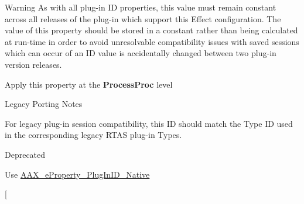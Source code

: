 \begin{Desc}
\begin{description}
\begin{DoxyWarning}{Warning}
As with all plug-\/in I\+D properties, this value must remain constant across all releases of the plug-\/in which support this Effect configuration. The value of this property should be stored in a constant rather than being calculated at run-\/time in order to avoid unresolvable compatibility issues with saved sessions which can occur of an I\+D value is accidentally changed between two plug-\/in version releases.
\end{DoxyWarning}
\begin{DoxyItemize}
\item Apply this property at the {\bfseries Process\+Proc} level\end{DoxyItemize}
\begin{DoxyRefDesc}{Legacy Porting Notes}
\item[\hyperlink{a00384__porting_notes000043}{Legacy Porting Notes}]For legacy plug-\/in session compatibility, this I\+D should match the Type I\+D used in the corresponding legacy R\+T\+A\+S plug-\/in Types. \end{DoxyRefDesc}
\item[{\em 
\hypertarget{a00283_a6571f4e41a5dd06e4067249228e2249ea01880753b83fc0a40d99a5381301a9cf}{}A\+A\+X\+\_\+e\+Property\+\_\+\+Plug\+In\+I\+D\+\_\+\+R\+T\+A\+S\label{a00283_a6571f4e41a5dd06e4067249228e2249ea01880753b83fc0a40d99a5381301a9cf}
}]\begin{DoxyRefDesc}{Deprecated}
\item[\hyperlink{a00386__deprecated000015}{Deprecated}]Use \hyperlink{a00283_a6571f4e41a5dd06e4067249228e2249ea89ca3dd6e96895cda14976c1b1ceb826}{A\+A\+X\+\_\+e\+Property\+\_\+\+Plug\+In\+I\+D\+\_\+\+Native} \end{DoxyRefDesc}
\item[{\em 
}
\end{description}
\end{Desc}
